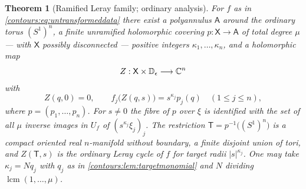 \documentclass[11pt,letterpaper]{article}
\newtheorem{theorem}{Theorem}[section]
\theoremstyle{definition}
\theoremstyle{remark}
\numberwithin{equation}{section}
\begin{document}
\begin{theorem}[Ramified Leray family; ordinary analysis]
\label{contours:thm:ramifiedleray}
For $f$ as in \eqref{contours:eq:untransformeddata} there exist a polyannulus
$\mathsf A$ around the ordinary torus $(S^1)^n$, a finite unramified holomorphic
covering $p:\mathsf X\to\mathsf A$ of total degree $\mu$ --- with $\mathsf X$ possibly
disconnected --- positive integers $\kappa_1,\ldots,\kappa_n$, and a
holomorphic map
\[
  Z:\mathsf X\times\mathbb D_\epsilon\longrightarrow\mathbb C^n
\]
with
\begin{equation}\label{contours:eq:ordinaryZ}
  Z(q,0)=0,\qquad f_j\bigl(Z(q,s)\bigr)=s^{\kappa_j}p_j(q)
  \quad(1\le j\le n),
\end{equation}
where $p=(p_1,\ldots,p_n)$. For $s\ne0$ the fibre of $p$ over $\xi$ is
identified with the set of all $\mu$ inverse images in $U_f$ of
$(s^{\kappa_j}\xi_j)_j$. The restriction
$\mathsf T=p^{-1}\bigl((S^1)^n\bigr)$ is a compact oriented real
$n$-manifold without boundary, a finite disjoint union of tori, and
$Z(\mathsf T,s)$ is the ordinary Leray cycle of $f$ for target radii
$|s|^{\kappa_j}$. One may take $\kappa_j=Nq_j$ with $q_j$ as in
\cref{contours:lem:targetmonomial} and $N$ dividing
$\operatorname{lcm}(1,\ldots,\mu)$.
\end{theorem}
\end{document}
